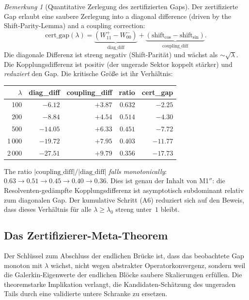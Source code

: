 ﻿\documentclass[12pt,a4paper]{article}
\theoremstyle{definition}
\theoremstyle{remark}
\newtheorem{remark}[theorem]{Bemerkung}
\begin{document}
\begin{remark}[Quantitative Zerlegung des zertifizierten Gaps]
\label{rem:gap-decomposition}
Der zertifizierte Gap erlaubt eine saubere Zerlegung into a diagonal difference (driven by the Shift-Parity-Lemma) and a coupling correction:
\[
  \mathrm{cert\_gap}(\lambda) = \underbrace{(W_{11}^+ - W_{00}^-)}_{\text{diag\_diff}} + \underbrace{(\text{shift}_{\cos} - \text{shift}_{\sin})}_{\text{coupling\_diff}}.
\]
Die diagonale Differenz ist streng negativ (Shift-Parität) und wächst als $\sim\!\sqrt{\lambda}$. Die Kopplungsdifferenz ist positiv (der ungerade Sektor koppelt stärker) und \emph{reduziert} den Gap. Die kritische Größe ist ihr Verhältnis:

\begin{center}
\small
\begin{tabular}{r|r|r|r|r}
$\lambda$ & diag\_diff & coupling\_diff & ratio & cert\_gap \\\hline
100 & $-6.12$ & $+3.87$ & $0.632$ & $-2.25$ \\
200 & $-8.84$ & $+4.54$ & $0.514$ & $-4.30$ \\
500 & $-14.05$ & $+6.33$ & $0.451$ & $-7.72$ \\
1\,000 & $-19.72$ & $+7.95$ & $0.403$ & $-11.77$ \\
2\,000 & $-27.51$ & $+9.79$ & $0.356$ & $-17.73$
\end{tabular}
\end{center}

\noindent The ratio $|\text{coupling\_diff}|/|\text{diag\_diff}|$ \emph{falls monotonically}: $0.63 \to 0.51 \to 0.45 \to 0.40 \to 0.36$. Dies ist genau der Inhalt von M1$''$: die Resolventen-gedämpfte Kopplungsdifferenz ist asymptotisch subdominant relativ zum diagonalen Gap. Der kumulative Schritt (A6) reduziert sich auf den Beweis, dass dieses Verhältnis für alle $\lambda \geq \lambda_0$ streng unter~$1$ bleibt.
\end{remark}

\subsection{Das Zertifizierer-Meta-Theorem}
\label{sec:meta-theorem}

Der Schlüssel zum Abschluss der endlichen Brücke ist, dass das beobachtete Gap monoton mit $\lambda$ wächst, nicht wegen abstrakter Operatorkonvergenz, sondern weil die Galerkin-Eigenwerte der endlichen Blöcke saubere Skalierungen erfüllen. Die theoremstarke Implikation verlangt, die Kandidaten-Schätzung des ungeraden Tails durch eine validierte untere Schranke zu ersetzen.
\end{document}
